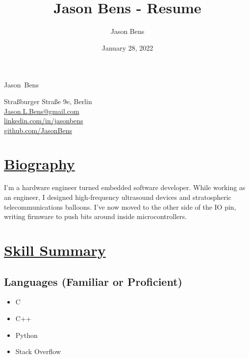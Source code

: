 \documentclass[a4paper, 11pt]{article}
\title{Jason Bens - Resume}
\author{Jason Bens}
\date{January 28, 2022}
\makeatletter
\newcommand {\firstname} {Jason}
\newcommand {\lastname} {Bens}
\newcommand {\address} {Straßburger Straße 9e, Berlin}
\newcommand {\email} {\url{Jason.L.Bens@gmail.com}}
\newcommand {\linkedin} {\url{linkedin.com/in/jasonbens}}
\newcommand {\github} {\url{github.com/JasonBens}}
\makeatother
\begin{document}
\begin{minipage}[t]{0.4\textwidth}  
  \begin{flushright}
    {\Huge \firstname~\lastname}
  \end{flushright}
\end{minipage}
\hfill
\begin{minipage}{0.42\textwidth}
  \begin{flushright}
    \address \\
    \email \\
    \linkedin \\
    \github \\
  \end{flushright}
\end{minipage}

\hrulefill

\section{\underline{Biography}}
I'm a hardware engineer turned embedded software developer.  While working as an engineer, I designed high-frequency ultrasound devices and stratospheric telecommunications balloons.  I've now moved to the other side of the IO pin, writing firmware to push bits around inside microcontrollers.

\section{\underline{Skill Summary}}
  \subsection{Languages (Familiar or Proficient)}
  \begin{itemize}[nosep]
    \item C
    \item C++ 
    \item Python
    \item Stack Overflow
  \end{itemize}
\end{document}
